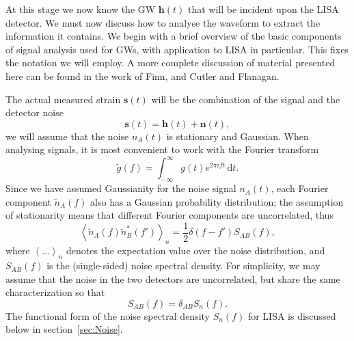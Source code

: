 \documentclass[a4paper, 11pt, titlepage, twoside]{report}
\newcommand{\secref}[1]{section~\ref{sec:#1}}
\newcommand{\recip}[1]{\ensuremath{\frac{1}{#1}}}
\newcommand{\dd}{\ensuremath{\mathrm{d}}}
\newcommand{\intd}[4]{\ensuremath{\int_{#1}^{#2}{#3}\,\dd{#4}}}
\begin{document}
At this stage we now know the GW $\boldsymbol{h}(t)$ that will be incident upon the LISA detector. We must now discuss how to analyse the waveform to extract the information it contains. We begin with a brief overview of the basic components of signal analysis used for GWs, with application to LISA in particular. This fixes the notation we will employ. A more complete discussion of material presented here can be found in the work of Finn\cite{Finn1992}, and Cutler and Flanagan\cite{Cutler1994}.

The actual measured strain $\boldsymbol{s}(t)$ will be the combination of the signal and the detector noise
\begin{equation}
\boldsymbol{s}(t) = \boldsymbol{h}(t) + \boldsymbol{n}(t),
\end{equation}
we will assume that the noise $n_A(t)$ is stationary and Gaussian. When analysing signals, it is most convenient to work with the Fourier transform
\begin{equation}
\tilde{g}(f) = \intd{-\infty}{\infty}{g(t)e^{2\pi i ft}}{t}.
\end{equation}
Since we have assumed Gaussianity for the noise signal $n_A(t)$, each Fourier component $\tilde{n}_A(f)$ also has a Gaussian probability distribution; the assumption of stationarity means that different Fourier components are uncorrelated, thus\cite{Cutler1994}
\begin{equation}
\left\langle\tilde{n}_A(f)\tilde{n}_B^*(f')\right\rangle_n = \recip{2}\delta(f - f')S_{AB}(f),
\end{equation}
where $\left\langle\ldots\right\rangle_n$ denotes the expectation value over the noise distribution, and $S_{AB}(f)$ is the (single-sided) noise spectral density. For simplicity, we may assume that the noise in the two detectors are uncorrelated, but share the same characterization so that\cite{Cutler1998}
\begin{equation}
S_{AB}(f) = \delta_{AB}S_n(f).
\end{equation}
The functional form of the noise spectral density $S_n(f)$ for LISA is discussed below in \secref{Noise}.
\end{document}

